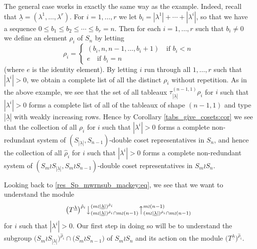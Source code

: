 \documentclass[10pt]{article}
\theoremstyle{definition}
\newcommand{\ul}[1]{\underline{#1}}
\begin{document}
The general case works in exactly the same way as the example. Indeed, recall that $\ul{\lambda} = (\lambda^1,\ldots,\lambda^r)$. For
$i=1,\ldots,r$ we let $b_i = |\lambda^1|+\cdots+|\lambda^i|$, so that we have a sequence $0 \leq b_1 \leq b_2 \leq \cdots \leq b_r = n$.
Then for each $i=1,\ldots,r$ such that $b_i \neq 0$ we define an element $\rho_i$ of $S_n$ by letting
\[
\rho_i = \begin{cases}
(b_i,n,n-1,\ldots,b_i+1) \quad\text{if $b_i < n$}\\
e \quad\text{if $b_i = n$}
\end{cases}
\]
(where $e$ is the identity element). By letting $i$ run through all $1,\ldots,r$ such that $|\lambda^i| > 0$, we obtain a complete list
of all the distinct $\rho_i$ without repetition. As in the above example, we see that the set of all tableaux
$\tau^{(n-1,1)}_{|\ul{\lambda}|}\rho_i$ for $i$ such that $|\lambda^i| > 0$ forms a complete list of all of the tableaux of shape $(n-1,1)$
and type $|\ul{\lambda}|$ with weakly increasing rows. Hence by Corollary \ref{tabs_give_cosets:cor} we see that the collection of all
$\rho_i$ for $i$ such that $|\lambda^i| > 0$ forms a complete non-redundant system of $(S_{|\ul{\lambda}|},S_{n-1})$-double coset
representatives in $S_n$, and hence the collection of all $\hat\rho_i$ for $i$ such that $|\lambda^i| > 0$ forms a complete non-redundant
system of $(S_m \wr S_{|\ul{\lambda}|},S_m \wr S_{n-1})$-double coset representatives in $S_m \wr S_n$.

Looking back to \eqref{res_Sp_mwrnsub_mackey:eq}, we see that we want to understand the module
\[
\bigl(T^{\ul{\lambda}}\bigr)^{\hat\rho_i}\bigl\downarrow^{(m{\wr}|\ul{\lambda}|)^{\hat\rho_i}}_{(m{\wr}|\ul{\lambda}|)^{\hat\rho_i} \cap m \wr (n-1)}
\bigl\uparrow^{m \wr (n-1)}_{(m{\wr}|\ul{\lambda}|)^{\hat\rho_i} \cap m \wr (n-1)}
\]
for $i$ such that $|\lambda^i|>0$. Our first step in doing so will be to understand the subgroup
$\bigl(S_m \wr S_{|\ul{\lambda}|}\bigr)^{\hat\rho_i}\cap\bigl(S_m \wr S_{n-1}\bigr)$ of $S_m \wr S_n$ and its action on the module
$\bigl(T^{\ul{\lambda}}\bigr)^{\hat\rho_i}$.
\end{document}

